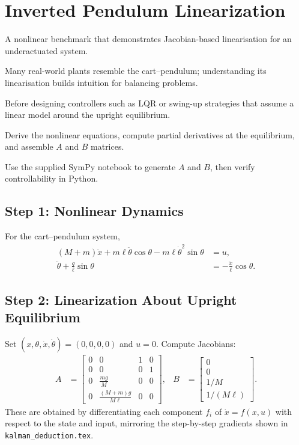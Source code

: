 \section{Inverted Pendulum Linearization}
\begin{beginnerguide}
    \item[\textbf{What?}] A nonlinear benchmark that demonstrates Jacobian-based linearisation for an underactuated system.
    \item[\textbf{Why?}] Many real-world plants resemble the cart–pendulum; understanding its linearisation builds intuition for balancing problems.
    \item[\textbf{When?}] Before designing controllers such as LQR or swing-up strategies that assume a linear model around the upright equilibrium.
    \item[\textbf{How?}] Derive the nonlinear equations, compute partial derivatives at the equilibrium, and assemble $A$ and $B$ matrices.
    \item[\textbf{Example}] Use the supplied SymPy notebook to generate $A$ and $B$, then verify controllability in Python.
\end{beginnerguide}
\subsection{Step 1: Nonlinear Dynamics}
For the cart--pendulum system,
\begin{align*}
    (M + m)\ddot{x} + m\ell \ddot{\theta}\cos\theta - m\ell \dot{\theta}^2 \sin\theta &= u,\\
    \ddot{\theta} + \frac{g}{\ell}\sin\theta &= -\frac{\ddot{x}}{\ell}\cos\theta.
\end{align*}

\subsection{Step 2: Linearization About Upright Equilibrium}
Set $(x,\theta,\dot{x},\dot{\theta}) = (0,0,0,0)$ and $u=0$. Compute Jacobians:
\begin{align*}
    A &= \begin{bmatrix}
        0 & 0 & 1 & 0 \\
        0 & 0 & 0 & 1 \\
        0 & \frac{m g}{M} & 0 & 0 \\
        0 & \frac{(M + m) g}{M \ell} & 0 & 0
    \end{bmatrix}, &
    B &= \begin{bmatrix}
        0 \\ 0 \\ 1/M \\ 1/(M\ell)
    \end{bmatrix}.
\end{align*}
These are obtained by differentiating each component $f_i$ of $\dot{x} = f(x,u)$ with respect to the state and input, mirroring the step-by-step gradients shown in \texttt{kalman\_deduction.tex}.

